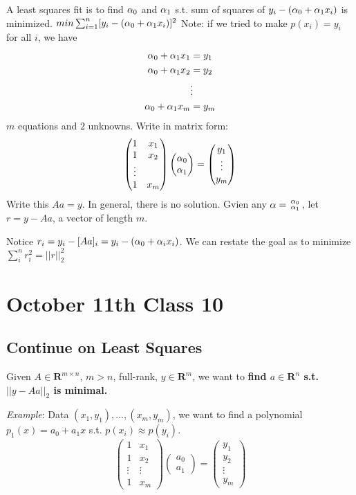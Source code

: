 \noi
A least squares fit is to find $\alpha_0$ and $\alpha_1$ s.t. sum of squares
of $y_i-(\alpha_0+\alpha_1x_i)$ is minimized. $min
\sum_{i=1}^n[y_i-(\alpha_0+\alpha_1x_i)]^2$
Note: if we tried to make $p(x_i)=y_i$ for all $i$, we have
\begin{align*}
\alpha_0+\alpha_1x_1 &= y_1\\  
\alpha_0+\alpha_1x_2 &= y_2\\ 
&\vdots\\
 \alpha_0+\alpha_1x_m &= y_m\\  
\end{align*}
$m$ equations and $2$ unknowns. Write in matrix form:
$$\begin{pmatrix}
  1&x_1\\
  1&x_2\\
\vdots\\
  1&x_m\\
\end{pmatrix}
\begin{pmatrix}
  \alpha_0\\ \alpha_1
\end{pmatrix} = \begin{pmatrix}
  y_1\\ \vdots \\ y_m
\end{pmatrix}$$
Write this $Aa=y$. In general, there is no solution. Gvien any $\alpha =
\begin{smallmatrix}
  \alpha_0\\ \alpha_1
\end{smallmatrix}$, let $r=y-Aa$, a vector of length $m$.

Notice $r_i=y_i-[Aa]_i=y_i-(\alpha_0+\alpha_ix_i)$. We can restate the goal
as to minimize $\sum_i^n r_i^2 = ||r||_2^2$

\section{October 11th Class 10}
\label{sec:class10}

\subsection{Continue on Least Squares}
\label{sec:leastsqares}
Given $A\in \mathbf{R}^{m\times n}$, $m>n$, full-rank, $y\in
\mathbf{R}^m$, we want to \textbf{find $a\in \mathbf{R}^n$ s.t. $||y-Aa||_2$
is minimal.}

\emph{Example}: Data $(x_1,y_1), \dots, (x_m, y_m)$, we want to find a
polynomial $p_1(x) = a_0+a_1x$ s.t. $p(x_i)\approx p(y_i)$.
$$
\begin{pmatrix}
  1 & x_1\\
1 &x_2 \\
\vdots & \vdots \\
1 & x_m
\end{pmatrix}
\begin{pmatrix}
  a_0 \\ a_1
\end{pmatrix}
=
\begin{pmatrix}
  y_1\\ y_2 \\ \vdots \\ y_m
\end{pmatrix}
$$

